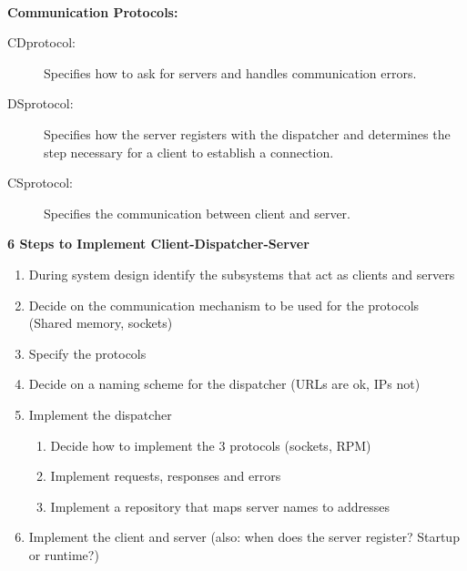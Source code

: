 \\
\textbf{Communication Protocols:}
\begin{description}
  \item[CDprotocol:] Specifies how to ask for servers and handles communication errors.
  \item[DSprotocol:] Specifies how the server registers with the dispatcher and determines the step necessary for a client to establish a connection.
  \item[CSprotocol:] Specifies the communication between client and server.
\end{description}

\textbf{6 Steps to Implement Client-Dispatcher-Server}
\begin{enumerate}
  \item During system design identify the subsystems that act as clients and servers
  \item Decide on the communication mechanism to be used for the protocols (Shared memory, sockets)
  \item Specify the protocols
  \item Decide on a naming scheme for the dispatcher (URLs are ok, IPs not)
  \item Implement the dispatcher
  \begin{enumerate}
    \item Decide how to implement the 3 protocols (sockets, RPM)
    \item Implement requests, responses and errors
    \item Implement a repository that maps server names to addresses
  \end{enumerate}
  \item Implement the client and server (also: when does the server register? Startup or runtime?)
\end{enumerate}
\newpage


